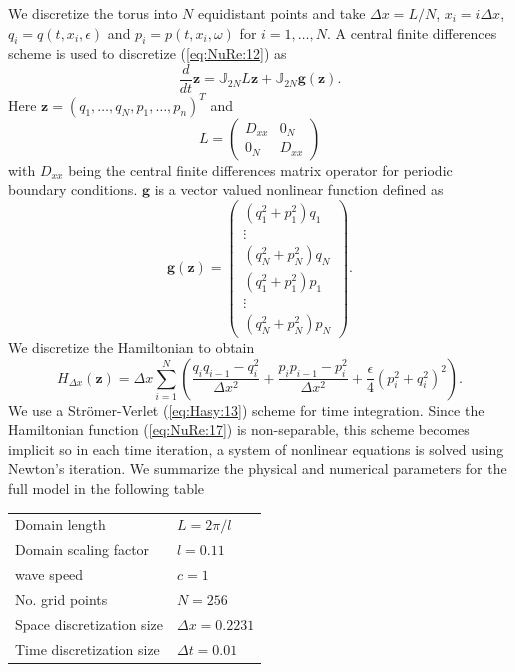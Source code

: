 We discretize the torus into $N$ equidistant points and take $\Delta x = L/N$, $x_i = i\Delta x$, $q_i=q(t,x_i,\epsilon)$ and $p_i = p(t,x_i,\omega)$ for $i = 1 ,\dots,N$. A central finite differences scheme is used to discretize (\ref{eq:NuRe:12}) as
\begin{equation}  \label{eq:NuRe:14}
	\frac{d}{dt} \mathbf z = \mathbb J_{2N} L\mathbf z + \mathbb J_{2N} \mathbf g(\mathbf z).
\end{equation}
Here $\mathbf z = (q_1,\dots,q_N,p_1,\dots,p_n)^T$ and
\begin{equation}  \label{eq:NuRe:15}
	L = 
	\begin{pmatrix}
		D_{xx} & 0_N \\
		0_N & D_{xx}
	\end{pmatrix}
\end{equation}
with $D_{xx}$ being the central finite differences matrix operator for periodic boundary conditions. $\mathbf g$ is a vector valued nonlinear function defined as
\begin{equation}  \label{eq:NuRe:16}
	\mathbf g(\mathbf z) =
	\begin{pmatrix}
	(q_1^2 + p_1^2)q_1 \\
	\vdots \\
	(q_N^2 + p_N^2)q_N \\
	(q_1^2 + p_1^2)p_1 \\
	\vdots \\
	(q_N^2 + p_N^2)p_N
	\end{pmatrix}.
\end{equation}
We discretize the Hamiltonian to obtain
\begin{equation}  \label{eq:NuRe:17}
	H_{\Delta x}(\mathbf z) = {\Delta x}\sum_{i=1}^{N} \left( \frac{q_i q_{i-1} - q_i^2}{\Delta x ^2} + \frac{p_i p_{i-1} - p_i^2}{\Delta x ^2} + \frac \epsilon 4 (p_i^2 + q_i^2)^2  \right).
\end{equation}
We use a Str\"omer-Verlet (\ref{eq:Hasy:13}) scheme for time integration. Since the Hamiltonian function (\ref{eq:NuRe:17}) is non-separable, this scheme becomes implicit so in each time iteration, a system of nonlinear equations is solved using Newton's iteration. We summarize the physical and numerical parameters for the full model in the following table

\vspace{0.5cm}
\begin{center}
\begin{tabular}{|l|l|}
\hline
Domain length & $L = 2\pi /l$ \\
Domain scaling factor & $l = 0.11$ \\
wave speed & $c =1$\\
No. grid points & $N = 256$ \\
Space discretization size & $\Delta x = 0.2231$ \\
Time discretization size & $\Delta t = 0.01$ \\
\hline
\end{tabular}
\end{center}
\vspace{0.5cm}

